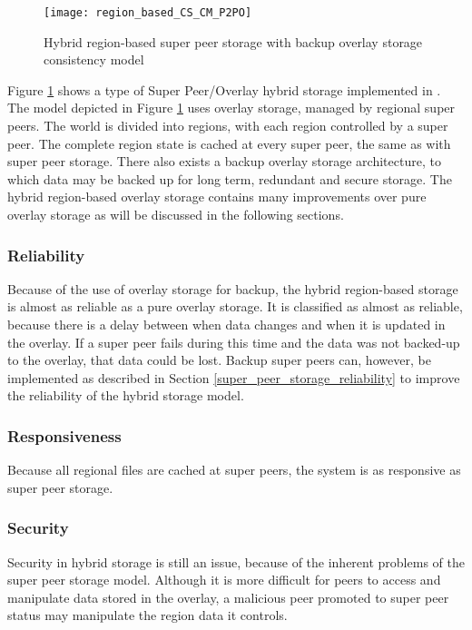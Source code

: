 \begin{figure}[htbp]
 \centering
 \texttt{[image: region\_based\_CS\_CM\_P2PO]}
 \caption{Hybrid region-based super peer storage with backup overlay storage consistency model}
 \label{fig_cs_region_o_cm}
\end{figure}
%
Figure \ref{fig_cs_region_o_cm} shows a type of Super Peer/Overlay hybrid storage implemented in  \cite{zoned_federation}. The model depicted in Figure \ref{fig_cs_region_o_cm} uses overlay storage, managed by regional super peers. The world is divided into regions, with each region controlled by a super peer. The complete region state is cached at every super peer, the same as with super peer storage. There also exists a backup
overlay storage architecture, to which data may be backed up for long term, redundant and secure storage. The hybrid region-based overlay storage contains many improvements over pure overlay storage as will be discussed in the following sections.

\subsubsection{Reliability}
\label{hybrid_storage_reliability}

Because of the use of overlay storage for backup, the hybrid region-based storage is almost as reliable as a pure overlay storage. It is classified as almost as reliable, because there is a delay between when data changes and when it is updated in the overlay. If a super peer fails during this time and the data was not backed-up to the overlay, that data could be lost. Backup super peers can, however, be implemented as described in Section
\ref{super_peer_storage_reliability} to improve the reliability of the hybrid storage model.

\subsubsection{Responsiveness}

Because all regional files are cached at super peers, the system is as responsive as super peer storage.

\subsubsection{Security}

Security in hybrid storage is still an issue, because of the inherent problems of the super peer storage model. Although it is more difficult for peers to access and manipulate data stored in the overlay, a malicious peer promoted to super peer status may manipulate the region data it controls.

